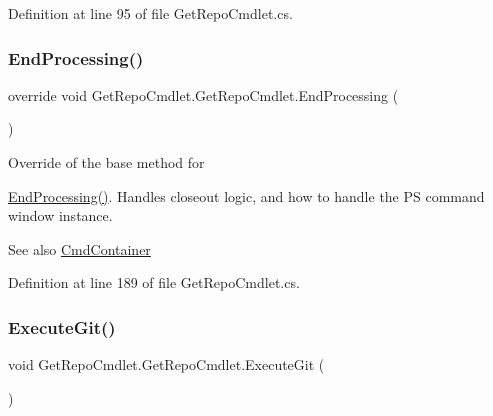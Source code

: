 Definition at line 95 of file Get\+Repo\+Cmdlet.\+cs.

\mbox{\label{class_get_repo_cmdlet_1_1_get_repo_cmdlet_a0968e20b2c03f033c93c2a74c643d06b}} 
\subsubsection{\texorpdfstring{End\+Processing()}{EndProcessing()}}
{\footnotesize\ttfamily override void Get\+Repo\+Cmdlet.\+Get\+Repo\+Cmdlet.\+End\+Processing (\begin{DoxyParamCaption}{ }\end{DoxyParamCaption})\hspace{0.3cm}{\ttfamily [protected]}}



Override of the base method for 

{\ttfamily \mbox{\hyperlink{class_get_repo_cmdlet_1_1_get_repo_cmdlet_a0968e20b2c03f033c93c2a74c643d06b}{End\+Processing()}}}. Handles closeout logic, and how to handle the PS command window instance. 

\begin{DoxySeeAlso}{See also}
\mbox{\hyperlink{class_get_repo_cmdlet_1_1_cmd_container}{Cmd\+Container}}


\end{DoxySeeAlso}


Definition at line 189 of file Get\+Repo\+Cmdlet.\+cs.

\mbox{\label{class_get_repo_cmdlet_1_1_get_repo_cmdlet_a6d4524a1c3d700585b10ba0f0a6ec157}} 
\subsubsection{\texorpdfstring{Execute\+Git()}{ExecuteGit()}}
{\footnotesize\ttfamily void Get\+Repo\+Cmdlet.\+Get\+Repo\+Cmdlet.\+Execute\+Git (\begin{DoxyParamCaption}{ }\end{DoxyParamCaption})\hspace{0.3cm}{\ttfamily [private]}}



